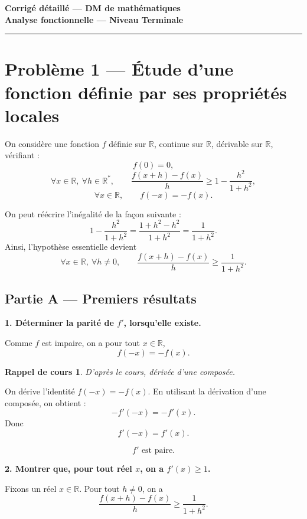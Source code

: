 \documentclass[11pt,a4paper]{article}
\newtheorem*{rappel}{Rappel de cours}
\newcommand{\R}{\mathbb{R}}
\begin{document}
\begin{center}
    {\LARGE \textbf{Corrigé détaillé --- DM de mathématiques}}\\[0.4em]
    {\large \textbf{Analyse fonctionnelle --- Niveau Terminale}}\\[0.8em]
\end{center}

\hrule
\vspace{0.8em}



\section*{Problème 1 --- Étude d'une fonction définie par ses propriétés locales}

On considère une fonction \(f\) définie sur \(\R\), continue sur \(\R\), dérivable sur \(\R\), vérifiant :
\[
f(0)=0,
\]
\[
\forall x\in\R,\ \forall h\in\R^\ast,\qquad
\frac{f(x+h)-f(x)}{h}\ge 1-\frac{h^2}{1+h^2},
\]
\[
\forall x\in\R,\qquad f(-x)=-f(x).
\]

On peut réécrire l'inégalité de la façon suivante :
\[
1-\frac{h^2}{1+h^2}=\frac{1+h^2-h^2}{1+h^2}=\frac{1}{1+h^2}.
\]
Ainsi, l'hypothèse essentielle devient
\[
\forall x\in\R,\ \forall h\neq 0,\qquad
\frac{f(x+h)-f(x)}{h}\ge \frac{1}{1+h^2}.
\]

\subsection*{Partie A --- Premiers résultats}

\textbf{1. Déterminer la parité de \(f'\), lorsqu'elle existe.}

Comme \(f\) est impaire, on a pour tout \(x\in\R\),
\[
f(-x)=-f(x).
\]

\begin{rappel}
D'après le cours, dérivée d'une composée.
\end{rappel}

On dérive l'identité \(f(-x)=-f(x)\). En utilisant la dérivation d'une composée, on obtient :
\[
-f'(-x)=-f'(x).
\]
Donc
\[
f'(-x)=f'(x).
\]

\[
\boxed{f' \text{ est paire.}}
\]

\bigskip

\textbf{2. Montrer que, pour tout réel \(x\), on a \(f'(x)\ge 1\).}

Fixons un réel \(x\in\R\). Pour tout \(h\neq 0\), on a
\[
\frac{f(x+h)-f(x)}{h}\ge \frac{1}{1+h^2}.
\]
\end{document}
